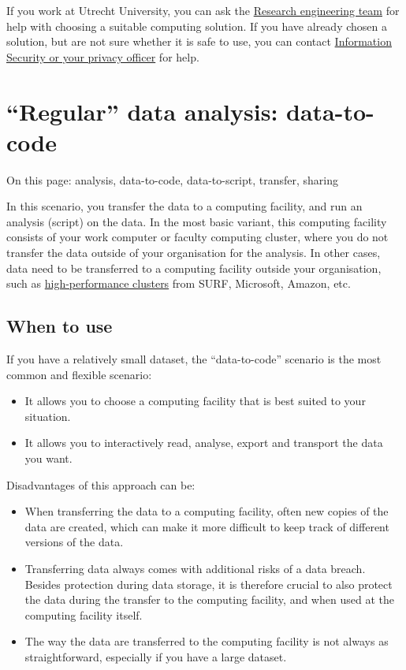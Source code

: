 \documentclass[
]{book}
\providecommand{\tightlist}{%
  \setlength{\itemsep}{0pt}\setlength{\parskip}{0pt}}
\begin{document}
If you work at Utrecht University, you can ask the
\href{https://www.uu.nl/en/research/research-data-management/contact-us}{Research engineering team}
for help with choosing a suitable computing solution. If you have already
chosen a solution, but are not sure whether it is safe to use, you can contact
\protect\hyperlink{support}{Information Security or your privacy officer} for help.

\hypertarget{data-to-code}{%
\section{``Regular'' data analysis: data-to-code}\label{data-to-code}}

On this page: analysis, data-to-code, data-to-script, transfer, sharing

In this scenario, you transfer the data to a computing facility, and run an
analysis (script) on the data.
In the most basic variant, this computing facility consists of your work
computer or faculty computing cluster, where you do not transfer the data
outside of your organisation for the analysis. In other cases, data need to
be transferred to a computing facility outside your organisation, such as
\href{https://www.uu.nl/en/research/research-data-management/tools-services/software-and-computing/high-performance-and-cloud-computing}{high-performance clusters}
from SURF, Microsoft, Amazon, etc.

\hypertarget{when-to-use}{%
\subsection{When to use}\label{when-to-use}}

If you have a relatively small dataset, the ``data-to-code'' scenario is the most
common and flexible scenario:

\begin{itemize}
\tightlist
\item
  It allows you to choose a computing facility that is best suited to your
  situation.\\
\item
  It allows you to interactively read, analyse, export and transport the data
  you want.
\end{itemize}

Disadvantages of this approach can be:

\begin{itemize}
\tightlist
\item
  When transferring the data to a computing facility, often new copies of the
  data are created, which can make it more difficult to keep track of different
  versions of the data.
\item
  Transferring data always comes with additional risks of a data breach. Besides
  protection during data storage, it is therefore crucial to also protect the data
  during the transfer to the computing facility, and when used at the computing
  facility itself.\\
\item
  The way the data are transferred to the computing facility is not always as
  straightforward, especially if you have a large dataset.
\end{itemize}
\end{document}
